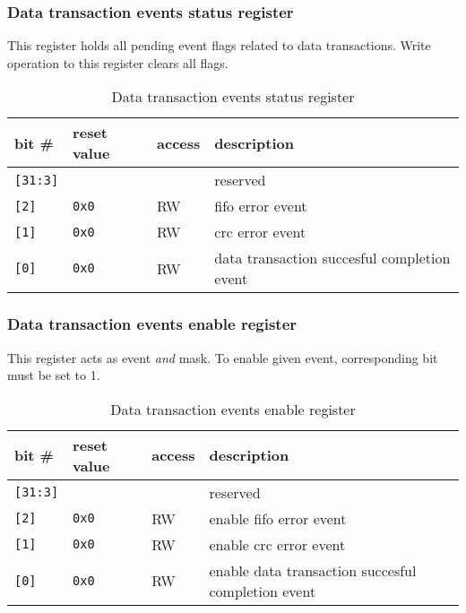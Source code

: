     \subsubsection{Data transaction events status register}
    \label{sec:data_evt_reg}
    
    This register holds all pending event flags related to data transactions. Write operation to this register
    clears all flags.
    
    \begin{table}[H]
    \caption{Data transaction events status register}
        \begin{tabular}{m{1.3cm}|m{2cm}|m{1cm}|m{8cm}}
                \rowcolor[gray]{0.7} bit \# & reset value & access & description \\ \hline \hline
                \texttt{[31:3]} & & & reserved \\ \hline
                \texttt{[2]} & \texttt{0x0} & RW & fifo error event \\ \hline
                \texttt{[1]} & \texttt{0x0} & RW & crc error event \\ \hline
                \texttt{[0]} & \texttt{0x0} & RW & data transaction succesful completion event \\ \hline
                \hline
        \end{tabular}
        \label{tab:data_evt_reg}
    \end{table}
    
    \subsubsection{Data transaction events enable register}
    \label{sec:data_ena_reg}
    
    This register acts as event \textit{and} mask. To enable given event, corresponding bit must be set to 1.
    
    \begin{table}[H]
    \caption{Data transaction events enable register}
        \begin{tabular}{m{1.3cm}|m{2cm}|m{1cm}|m{8cm}}
                \rowcolor[gray]{0.7} bit \# & reset value & access & description \\ \hline \hline
                \texttt{[31:3]} & & & reserved \\ \hline
                \texttt{[2]} & \texttt{0x0} & RW & enable fifo error event \\ \hline
                \texttt{[1]} & \texttt{0x0} & RW & enable crc error event \\ \hline
                \texttt{[0]} & \texttt{0x0} & RW & enable data transaction succesful completion event \\ \hline
                \hline
        \end{tabular}
        \label{tab:data_ena_reg}
    \end{table}
    
